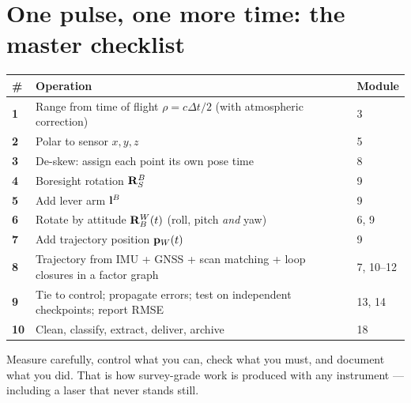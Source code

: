 \section{One pulse, one more time: the master checklist}
\begin{center}\small
\renewcommand{\arraystretch}{1.25}
\begin{tabularx}{\linewidth}{>{\bfseries}lXl}\toprule
\# & Operation & Module\\\midrule
1 & Range from time of flight $\rho=c\Delta t/2$ (with atmospheric correction) & 3\\
2 & Polar to sensor $x,y,z$ & 5\\
3 & De-skew: assign each point its own pose time & 8\\
4 & Boresight rotation $\mathbf{R}^B_S$ & 9\\
5 & Add lever arm $\mathbf{l}^B$ & 9\\
6 & Rotate by attitude $\mathbf{R}^W_B(t)$ (roll, pitch \emph{and} yaw) & 6, 9\\
7 & Add trajectory position $\mathbf{p}_W(t)$ & 9\\
8 & Trajectory from IMU + GNSS + scan matching + loop closures in a factor graph & 7, 10--12\\
9 & Tie to control; propagate errors; test on independent checkpoints; report RMSE & 13, 14\\
10 & Clean, classify, extract, deliver, archive & 18\\\bottomrule
\end{tabularx}\end{center}

\begin{bigidea}
Measure carefully, control what you can, check what you must, and document what you did. That is how survey-grade work is produced with any instrument --- including a laser that never stands still.
\end{bigidea}

